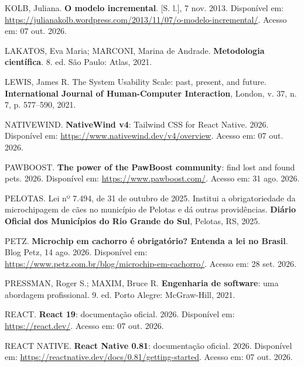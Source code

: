 \begin{flushleft}
\vspace{12pt}
\noindent KOLB, Juliana. \textbf{O modelo incremental}. [S. l.], 7 nov. 2013. Disponível em: \url{https://julianakolb.wordpress.com/2013/11/07/o-modelo-incremental/}. Acesso em: 07 out. 2026.

\vspace{12pt}
\noindent LAKATOS, Eva Maria; MARCONI, Marina de Andrade. \textbf{Metodologia científica}. 8. ed. São Paulo: Atlas, 2021.

\vspace{12pt}
\noindent LEWIS, James R. The System Usability Scale: past, present, and future. \textbf{International Journal of Human-Computer Interaction}, London, v. 37, n. 7, p. 577--590, 2021.

\vspace{12pt}
\noindent NATIVEWIND. \textbf{NativeWind v4}: Tailwind CSS for React Native. 2026. Disponível em: \url{https://www.nativewind.dev/v4/overview}. Acesso em: 07 out. 2026.

\noindent PAWBOOST. \textbf{The power of the PawBoost community}: find lost and found pets. 2026. Disponível em: \url{https://www.pawboost.com/}. Acesso em: 31 ago. 2026.

\vspace{12pt}
\noindent PELOTAS. Lei nº 7.494, de 31 de outubro de 2025. Institui a obrigatoriedade da microchipagem de cães no município de Pelotas e dá outras providências. \textbf{Diário Oficial dos Municípios do Rio Grande do Sul}, Pelotas, RS, 2025.

\vspace{12pt}
\noindent PETZ. \textbf{Microchip em cachorro é obrigatório? Entenda a lei no Brasil}. Blog Petz, 14 ago. 2026. Disponível em: \url{https://www.petz.com.br/blog/microchip-em-cachorro/}. Acesso em: 28 set. 2026.

\vspace{12pt}
\vspace{12pt}
\noindent PRESSMAN, Roger S.; MAXIM, Bruce R. \textbf{Engenharia de software}: uma abordagem profissional. 9. ed. Porto Alegre: McGraw-Hill, 2021.

\vspace{12pt}
\noindent REACT. \textbf{React 19}: documentação oficial. 2026. Disponível em: \url{https://react.dev/}. Acesso em: 07 out. 2026.

\vspace{12pt}
\noindent REACT NATIVE. \textbf{React Native 0.81}: documentação oficial. 2026. Disponível em: \url{https://reactnative.dev/docs/0.81/getting-started}. Acesso em: 07 out. 2026.


\end{flushleft}
